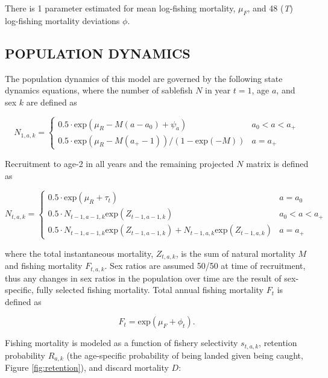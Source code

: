 \documentclass[
]{article}
\begin{document}
There is 1 parameter estimated for mean log-fishing mortality, \emph{\(\mu_F\)}, and 48 (\emph{T}) log-fishing mortality deviations \emph{\(\phi\)}.

\hypertarget{population-dynamics}{%
\subsection{POPULATION DYNAMICS}\label{population-dynamics}}

The population dynamics of this model are governed by the following state dynamics equations, where the number of sablefish \(N\) in year \(t=1\), age \(a\), and sex \(k\) are defined as

\[
\begin{equation}
N_{1,a,k} = \left\{ \begin{array}{ll}
0.5\cdot\mbox{exp}(\mu_R-M(a-a_0)+\psi_a) &a_{0}<a<a_{+}\\
0.5\cdot\mbox{exp}(\mu_R-M(a_{+}-1))/(1-\mbox{exp}(-M)) &a=a_{+}
\end{array}\right.
\label{eq:Nmat1}
\end{equation}
\]

Recruitment to age-2 in all years and the remaining projected \(N\) matrix is defined as

\[
\begin{equation}
N_{t,a,k} = \left\{ \begin{array}{ll}
0.5\cdot\mbox{exp}(\mu_R+\tau_t) &a=a_0\\
0.5\cdot N_{t-1,a-1,k}\mbox{exp}(Z_{t-1,a-1,k}) &a_{0}<a<a_{+}\\
0.5\cdot N_{t-1,a-1,k}\mbox{exp}(Z_{t-1,a-1,k})+N_{t-1,a,k}\mbox{exp}(Z_{t-1,a,k}) &a=a_{+}
\end{array}\right.
\label{eq:Nmat2}
\end{equation}
\]

where the total instantaneous mortality, \(Z_{t,a,k}\), is the sum of natural mortality \(M\) and fishing mortality \(F_{t,a,k}\). Sex ratios are assumed 50/50 at time of recruitment, thus any changes in sex ratios in the population over time are the result of sex-specific, fully selected fishing mortality.
Total annual fishing mortality \emph{\(F_t\)} is defined as

\[
\begin{equation}
F_t=\mbox{exp}(\mu_F+\phi_t).
\label{eq:fmort1}
\end{equation}
\]

Fishing mortality is modeled as a function of fishery selectivity \(s_{t,a,k}\), retention probability \(R_{a,k}\) (the age-specific probability of being landed given being caught, Figure \ref{fig:retention}), and discard mortality \(D\):
\end{document}
